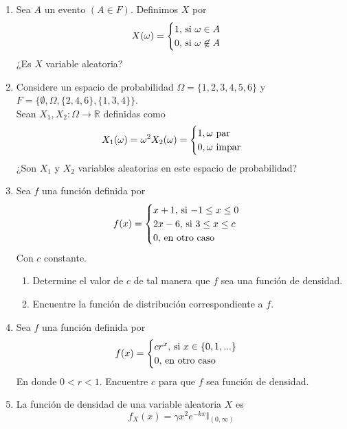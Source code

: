 \documentclass[12pt,a4paper]{report}
\begin{document}
	\begin{enumerate}
		\item {
			Sea $A$ un evento $(A \in F)$. Definimos $X$ por
			\[
				X(\omega) =
				\begin{cases}
					1, $ si $\omega \in A\\
					0, $ si $\omega \not\in A
				\end{cases}
			\]
			¿Es $X$ variable aleatoria?
		}
		\item {
			Considere un espacio de probabilidad $\Omega = \{1, 2, 3, 4, 5, 6\}$ y
			$F = \{\emptyset, \Omega, \{2, 4, 6\}, \{1, 3, 4\}\}$.\\
			Sean $X_1, X_2 : \Omega \rightarrow \mathbb{R}$ definidas como
			\begin{align*}
				X_1(\omega) = \omega^2 & X_2(\omega) = \begin{cases}
																								1, \omega $ par$\\
																								0, \omega $ impar$
																							\end{cases}
			\end{align*}
			¿Son $X_1$ y $X_2$ variables aleatorias en este espacio de probabilidad?
		}
		\item {
			Sea $f$ una función definida por
			\[
				f(x) = \begin{cases}
								x+1, $ si $ -1 \leq x \leq 0\\
								2x-6, $ si $ 3 \leq x \leq c\\
								0, $ en otro caso$
							 \end{cases}
			\]
			Con $c$ constante.
			\begin{enumerate}
				\item {
					Determine el valor de $c$ de tal manera que $f$ sea una función de
					densidad.
				}
				\item {
					Encuentre la función de distribución correspondiente a $f$.
				}
			\end{enumerate}
		}
		\item {
			Sea $f$ una función definida por
			\[
				f(x) = \begin{cases}
								cr^x, $ si $ x \in \{0, 1, ...\}\\
								0, $ en otro caso$
							 \end{cases}
			\]
			En donde $0 < r < 1$. Encuentre $c$ para que $f$ sea función de densidad.
		}
		\item {
		La función de densidad de una variable aleatoria $X$ es
		\[f_X(x) = \gamma x^2 e^{-kx}\mathbb{I}_{(0, \infty)}\]
}
\end{enumerate}
\end{document}
